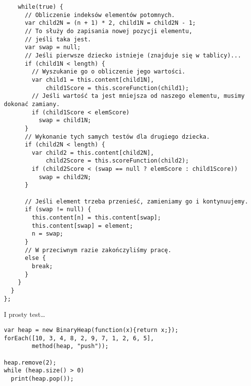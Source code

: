 \begin{verbatim}
    while(true) {
      // Obliczenie indeksów elementów potomnych.
      var child2N = (n + 1) * 2, child1N = child2N - 1;
      // To służy do zapisania nowej pozycji elementu,
      // jeśli taka jest.
      var swap = null;
      // Jeśli pierwsze dziecko istnieje (znajduje się w tablicy)...
      if (child1N < length) {
        // Wyszukanie go o obliczenie jego wartości.
        var child1 = this.content[child1N],
            child1Score = this.scoreFunction(child1);
        // Jeśli wartość ta jest mniejsza od naszego elementu, musimy dokonać zamiany.
        if (child1Score < elemScore)
          swap = child1N;
      }
      // Wykonanie tych samych testów dla drugiego dziecka.
      if (child2N < length) {
        var child2 = this.content[child2N],
            child2Score = this.scoreFunction(child2);
        if (child2Score < (swap == null ? elemScore : child1Score))
          swap = child2N;
      }

      // Jeśli element trzeba przenieść, zamieniamy go i kontynuujemy.
      if (swap != null) {
        this.content[n] = this.content[swap];
        this.content[swap] = element;
        n = swap;
      }
      // W przeciwnym razie zakończyliśmy pracę.
      else {
        break;
      }
    }
  }
};
\end{verbatim}
  
I prosty test…

 \begin{verbatim} 
var heap = new BinaryHeap(function(x){return x;});
forEach([10, 3, 4, 8, 2, 9, 7, 1, 2, 6, 5],
        method(heap, "push"));

heap.remove(2);
while (heap.size() > 0)
  print(heap.pop());
\end{verbatim}